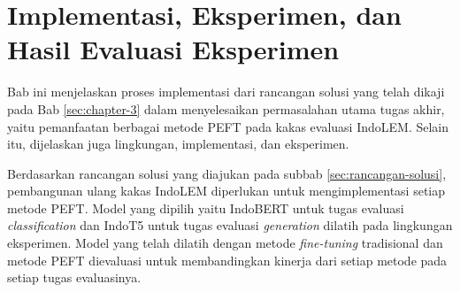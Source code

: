 \chapter{Implementasi, Eksperimen, dan Hasil Evaluasi Eksperimen}
Bab ini menjelaskan proses implementasi dari rancangan solusi yang telah dikaji pada Bab \ref{sec:chapter-3} dalam menyelesaikan permasalahan utama tugas akhir, yaitu pemanfaatan berbagai metode PEFT pada kakas evaluasi IndoLEM. Selain itu, dijelaskan juga lingkungan, implementasi, dan eksperimen.

Berdasarkan rancangan solusi yang diajukan pada subbab \ref{sec:rancangan-solusi}, pembangunan ulang kakas IndoLEM diperlukan untuk mengimplementasi setiap metode PEFT. Model yang dipilih yaitu IndoBERT untuk tugas evaluasi \textit{classification} dan IndoT5 untuk tugas evaluasi \textit{generation} dilatih pada lingkungan eksperimen. Model yang telah dilatih dengan metode \textit{fine-tuning} tradisional dan metode PEFT dievaluasi untuk membandingkan kinerja dari setiap metode pada setiap tugas evaluasinya.








